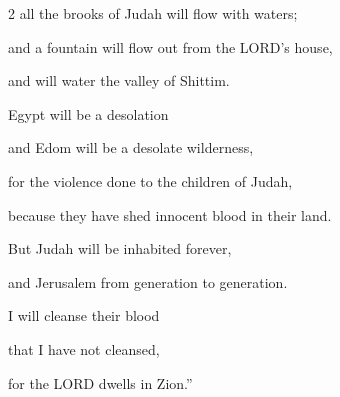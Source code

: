 \begin{multicols}{2}
all the brooks of Judah will flow with waters;

and a fountain will flow out from the LORD’s house,

and will water the valley of Shittim.

\myverse{}Egypt will be a desolation

and Edom will be a desolate wilderness,

for the violence done to the children of Judah,

because they have shed innocent blood in their land.

\myverse{}But Judah will be inhabited forever,

and Jerusalem from generation to generation.

\myverse{}I will cleanse their blood

that I have not cleansed,

for the LORD dwells in Zion.”
\end{multicols}
